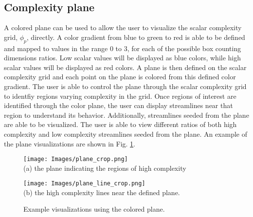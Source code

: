 \documentclass{egpubl}
\begin{document}
\subsection{Complexity plane}
A colored plane can be used to allow the user to visualize the scalar complexity grid, $\phi_p$, directly.
A color gradient from blue to green to red is able to be defined and mapped to values in the range 0 to 3, for each of the possible box counting dimensions ratios.
Low scalar values will be displayed as blue colors, while high scalar values will be displayed as red colors.
A plane is then defined on the scalar complexity grid and each point on the plane is colored from this defined color gradient.
The user is able to control the plane through the scalar complexity grid to identfiy regions varying complexity in the grid.
Once regions of interest are identified through the color plane, the user can display streamlines near that region to understand its behavior.
Additionally, streamlines seeded from the plane are able to be visualized.
The user is able to view different ratios of both high complexity and low complexity streamlines seeded from the plane.
An example of the plane visualizations are shown in Fig. \ref{fig:plane}.

\begin{figure}[h]
        \centering
                \begin{minipage}{0.45\linewidth}
                        \small
                        \texttt{[image: Images/plane\_crop.png]}\\(a) the plane indicating the regions of high complexity\vspace{0.2em}
                \end{minipage}
                \begin{minipage}{0.45\linewidth}
                        \small
                        \texttt{[image: Images/plane\_line\_crop.png]}\\(b) the high complexity lines near the defined plane.\vspace{0.2em}
                \end{minipage}
        \caption{Example visualizations using the colored plane.}
        \label{fig:plane}
\end{figure}
\end{document}
